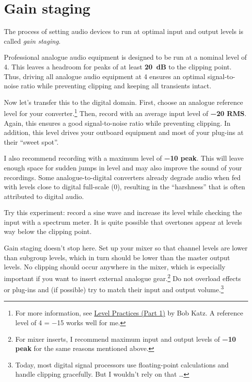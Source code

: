 \section{Gain staging}
\label{sec:gain_staging}

The process of setting audio devices to run at optimal input and
output levels is called \emph{gain staging}.

Professional analogue audio equipment is designed to be run at a
nominal level of \SI[retain-explicit-plus]{+4}{\dBu}.  This leaves a
headroom for peaks of at least \textbf{\SI{20}{\dB}} to the clipping
point.  Thus, driving all analogue audio equipment at
\SI[retain-explicit-plus]{+4}{\dBu} ensures an optimal signal-to-noise
ratio while preventing clipping and keeping all transients intact.

Now let's transfer this to the digital domain.  First, choose an
analogue reference level for your converter.\footnote{For more
  information, see
  \href{https://www.digido.com/portfolio-item/level-practices-part-1/}{Level
    Practices (Part 1)} by Bob Katz.  A reference level of
  \SI[retain-explicit-plus]{+4}{\dBu} = \SI{-15}{\dBFS} works well for
  me.}  Then, record with an average input level of
\textbf{\SI{-20}{\dBFS} RMS}.  Again, this ensures a good
signal-to-noise ratio while preventing clipping.  In addition, this
level drives your outboard equipment and most of your plug-ins at
their ``sweet spot''.

I also recommend recording with a maximum level of
\textbf{\SI{-10}{\dBFS} peak}.  This will leave enough space for
sudden jumps in level and may also improve the sound of your
recordings.  Some analogue-to-digital converters already degrade audio
when fed with levels close to digital full-scale (\SI{0}{\dBFS}),
resulting in the ``harshness'' that is often attributed to digital
audio.

Try this experiment: record a sine wave and increase its level while
checking the input with a spectrum meter.  It is quite possible that
overtones appear at levels way below the clipping point.

Gain staging doesn't stop here.  Set up your mixer so that channel
levels are lower than subgroup levels, which in turn should be lower
than the master output levels.  No clipping should occur anywhere in
the mixer, which is especially important if you want to insert
external analogue gear.\footnote{For mixer inserts, I recommend
  maximum input and output levels of \textbf{\SI{-10}{\dBFS} peak} for
  the same reasons mentioned above.}  Do not overload effects or
plug-ins and (if possible) try to match their input and output
volume.\footnote{Today, most digital signal processors use
  floating-point calculations and handle clipping gracefully.  But I
  wouldn't rely on that \dots}

